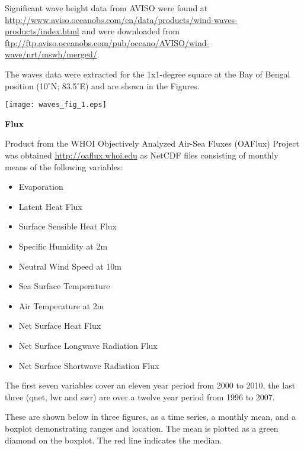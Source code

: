 \documentclass[letterpaper,12pt,oneside]{article}
\newcommand{\degree}{\ensuremath{^\circ}}
\newcommand{\SPURS}{Bay of Bengal}
\newcommand{\SitePos}{10\degree{N}; 83.5\degree{E}}
\begin{document}
Significant wave height data from AVISO were found at
\url{http://www.aviso.oceanobs.com/en/data/products/wind-waves-products/index.html}
and were downloaded from
\url{ftp://ftp.aviso.oceanobs.com/pub/oceano/AVISO/wind-wave/nrt/mswh/merged/}. 

The waves data were extracted for the 1x1-degree square at the
\SPURS{} position
(\SitePos) and are shown in the Figures.

\vspace{2\baselineskip}
\texttt{[image: waves\_fig\_1.eps]}

\clearpage


\begin{center}
\large\textbf{Flux}
\end{center}

Product from the WHOI Objectively Analyzed Air-Sea Fluxes (OAFlux) Project was
obtained \url{http://oaflux.whoi.edu} as NetCDF files consisting of monthly
means of the following variables:
 
\begin{itemize}
\item Evaporation
\item Latent Heat Flux
\item Surface Sensible Heat Flux
\item Specific Humidity at 2m
\item Neutral Wind Speed at 10m
\item Sea Surface Temperature
\item Air Temperature at 2m
\item Net Surface Heat Flux
\item Net Surface Longwave Radiation Flux
\item Net Surface Shortwave Radiation Flux
\end{itemize}

The first seven variables cover an eleven year period from 2000
to 2010, the last three (qnet, lwr and swr) are over a twelve
year period from 1996 to 2007.

These are shown below in three figures, as a time series, a monthly mean,
and a boxplot demonstrating ranges and location. The mean is plotted as a
green diamond on the boxplot.  The red line indicates the median.

\end{document}
